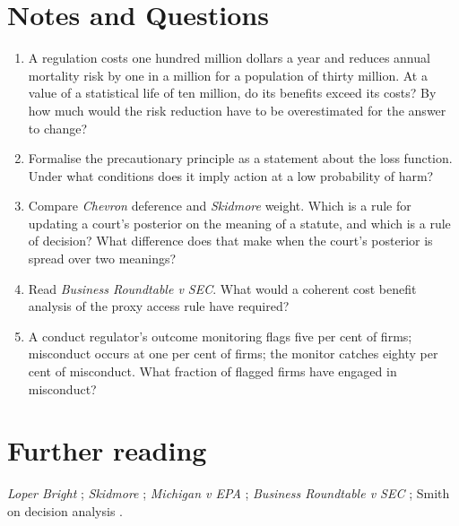 \section*{Notes and Questions}
\begin{enumerate}[label=\arabic*.]
\item A regulation costs one hundred million dollars a year and reduces annual mortality risk by one in a million for a population of thirty million. At a value of a statistical life of ten million, do its benefits exceed its costs? By how much would the risk reduction have to be overestimated for the answer to change?
\item Formalise the precautionary principle as a statement about the loss function. Under what conditions does it imply action at a low probability of harm?
\item Compare \emph{Chevron} deference and \emph{Skidmore} weight. Which is a rule for updating a court's posterior on the meaning of a statute, and which is a rule of decision? What difference does that make when the court's posterior is spread over two meanings?
\item Read \emph{Business Roundtable v SEC}. What would a coherent cost benefit analysis of the proxy access rule have required?
\item A conduct regulator's outcome monitoring flags five per cent of firms; misconduct occurs at one per cent of firms; the monitor catches eighty per cent of misconduct. What fraction of flagged firms have engaged in misconduct?
\end{enumerate}

\section*{Further reading}
\emph{Loper Bright} \citep{loperbright2024}; \emph{Skidmore} \citep{skidmore1944}; \emph{Michigan v EPA} \citep{michiganepa2015}; \emph{Business Roundtable v SEC} \citep{businessroundtable2011}; Smith on decision analysis \citep{smith2010}.
